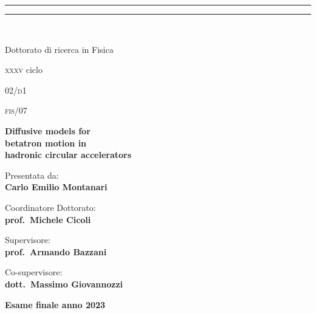 \begin{titlepage}
\begin{center}
{
{{\Large{\textsc{}}}}} 
{\rule[0.1cm]{\textwidth}{0.1mm}}
{\rule[0.5cm]{\textwidth}{0.6mm}}
\\

\vspace{2em}

\Large{Dottorato di ricerca in Fisica}

\vspace{1ex}

\large{\textsc{xxxv} ciclo}
\end{center}

\vspace{3em}

 02/\textsc{d}1

\vspace{1ex}

 \textsc{fis}/07

\vfill

\begin{center}{
{\LARGE{\bf Diffusive models for\\ betatron motion in \\ hadronic circular accelerators}}\\
}\end{center}

\vfill %

\noindent
\begin{minipage}{.45\textwidth}
\begin{flushleft}
{\color{unibo}Presentata da:}\\
\textbf{Carlo Emilio Montanari}
\end{flushleft}
\end{minipage}

\vfill

\noindent
\begin{minipage}[t]{.45\textwidth}
{\color{unibo}Coordinatore Dottorato:}\\
\textbf{prof.\ Michele Cicoli}
\end{minipage}
\hfill
\begin{minipage}[t]{.45\textwidth}
\begin{flushright}
{\color{unibo}Supervisore:}\\
\textbf{prof.\ Armando Bazzani}\\

\vspace{1em}

{\color{unibo}Co-supervisore:}\\
\textbf{dott.\ Massimo Giovannozzi}
\end{flushright}
\end{minipage}

\vfill

\begin{center}
\textbf{Esame finale anno 2023}
\end{center}
\end{titlepage}
